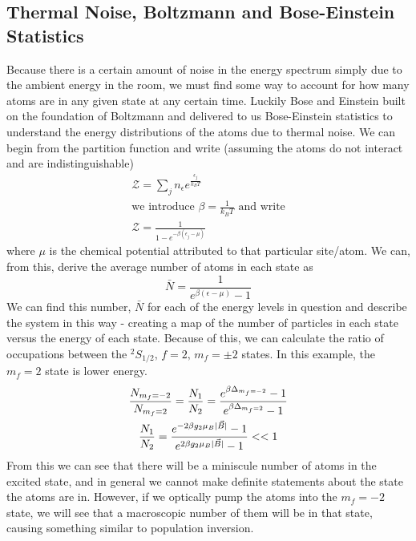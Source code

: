 \documentclass{article}
\newcommand{\twohalfmf}[2]{$^2 #1_{1/2},\, f = 2,\, m_f = #2$}
\DeclarePairedDelimiter\abs{\lvert}{\rvert}%
\begin{document}
  \subsection{Thermal Noise, Boltzmann and Bose-Einstein Statistics}
    Because there is a certain amount of noise in the energy spectrum simply due to the ambient energy in the room, we must find some way to account for how many atoms are in any given state at any certain time.  Luckily Bose and Einstein built on the foundation of Boltzmann and delivered to us Bose-Einstein statistics to understand the energy distributions of the atoms due to thermal noise.  We can begin from the partition function and write (assuming the atoms do not interact and are indistinguishable)
    \begin{gather*}
      \mathcal{Z} = \sum_j{n_{\epsilon}e^{\frac{\epsilon_j}{k_B T}}} \\
      \text{we introduce}\,\, \beta = \frac{1}{k_B T} \,\, \text{and write}\\
      \mathcal{Z} = \frac{1}{1 - e^{-\beta (\epsilon_j - \mu)}}
    \end{gather*}
    where $\mu$ is the chemical potential attributed to that particular site/atom.  We can, from this, derive the average number of atoms in each state as
    \begin{equation*}
      \bar{N} = \frac{1}{e^{\beta(\epsilon - \mu)} - 1}
    \end{equation*}
    We can find this number, $\bar{N}$ for each of the energy levels in question and describe the system in this way - creating a map of the number of particles in each state versus the energy of each state.  Because of this, we can calculate the ratio of occupations between the \twohalfmf{S}{\pm2} states.  In this example, the $m_f = 2$ state is lower energy.
    \begin{gather*}
      \frac{N_{m_f = -2}}{N_{m_f = 2}} = \frac{N_1}{N_2} = \frac{e^{\beta \Delta_{m_f = -2}} - 1}{e^{\beta \Delta_{m_f = 2}} - 1} \\
      \frac{N_1}{N_2}  = \frac{e^{-2 \beta g_2 \mu_B \abs{\vec{B}}} - 1}{e^{2 \beta g_2 \mu_B \abs{\vec{B}}} - 1} << 1
    \end{gather*}
    From this we can see that there will be a miniscule number of atoms in the excited state, and in general we cannot make definite statements about the state the atoms are in.  However, if we optically pump the atoms into the $m_f = -2$ state, we will see that a macroscopic number of them will be in that state, causing something similar to population inversion.
\end{document}
